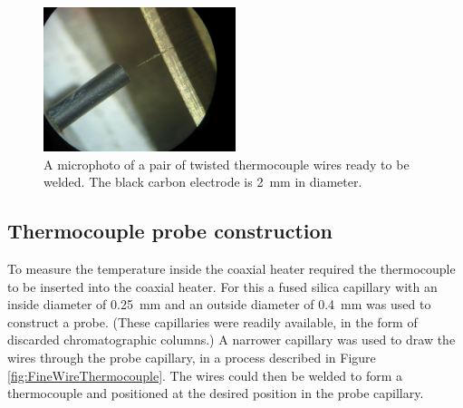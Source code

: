 \begin{figure}
	\centering
	\includegraphics[width=0.5\textwidth]{Figures/WelderMicro.jpg}
	\decoRule
	
\caption[A microphoto of a thermocouple twist ready to be welded.]{A microphoto
of a pair of twisted thermocouple wires ready to be welded. The black carbon
electrode is \SI{2}{\milli\metre} in diameter.}
	
	\label{fig:TCWeldMicro}
\end{figure}

\subsection{Thermocouple probe construction}

To measure the temperature inside the coaxial heater required the thermocouple
to be inserted into the coaxial heater. For this a fused silica capillary with
an inside diameter of \SI{0.25}{\milli\metre} and an outside diameter of
\SI{0.4}{\milli\metre} was used to construct a probe. (These capillaries were
readily available, in the form of discarded chromatographic columns.) A narrower
capillary was used to draw the wires through the probe capillary, in a process
described in Figure \ref{fig:FineWireThermocouple}. The wires could then be
welded to form a thermocouple and positioned at the desired position in the
probe capillary.

